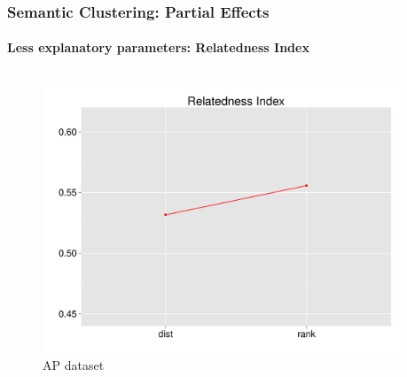 \documentclass[t]{beamer} %
\begin{document}
\begin{frame}
\begin{columns}
\begin{column}{0.5\textwidth}
    \end{column}
  \end{columns}  
  
\end{frame}




\begin{frame}
  \frametitle{Semantic Clustering: Partial Effects}
  \framesubtitle{Less explanatory parameters: Relatedness Index}

  \vspace{-18pt}

  \begin{columns}
    
    \begin{column}{0.5\textwidth}
      \begin{figure} 
        \hspace*{-18pt} 
        \includegraphics[scale=0.30]{img/lapesa_ap_main_relindex}
        \vspace{-10pt}
        \caption{AP dataset}
      \end{figure}
    \end{column}

    \begin{column}{0.5\textwidth}
      \centering
      

\end{column}
\end{columns}
\end{frame}
\end{document}
